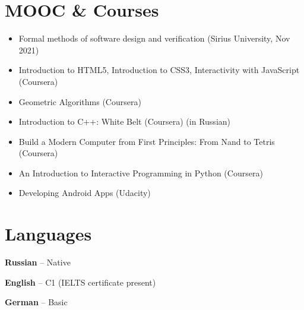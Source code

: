 \documentclass[11pt,a4paper]{moderncv}
\begin{document}
\section{MOOC \& Courses}
\begin{multicols}{3}
\begin{itemize}
    \item Formal methods of software design and verification (Sirius University, Nov 2021)
    \item Introduction to HTML5, Introduction to CSS3, Interactivity with JavaScript (Coursera)
    \item Geometric Algorithms (Coursera)
    \item Introduction to C++: White Belt (Coursera) (in Russian)
    \item Build a Modern Computer from First Principles: From Nand to Tetris (Coursera)
    \item An Introduction to Interactive Programming in Python (Coursera)
    \item Developing Android Apps (Udacity)
\end{itemize}
\end{multicols}


\section{Languages}
{\begin{multicols}{3}
\textbf{Russian} -- Native

\textbf{English} -- C1 (IELTS certificate present)

\textbf{German} -- Basic

\end{multicols}
}
\end{document}
